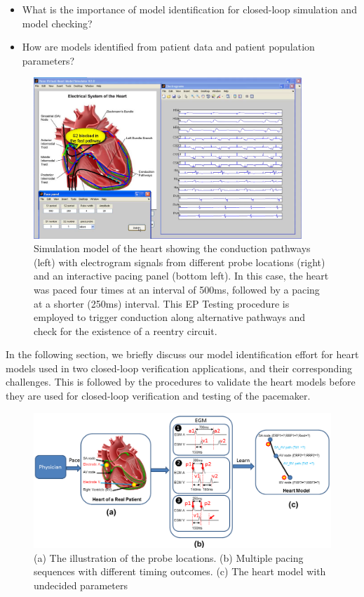 \begin{itemize}
	\vspace{-5pt}
	\item What is the importance of model identification for closed-loop simulation and model checking?
	\vspace{-5pt}
    	\item How are models identified from patient data and patient population parameters?
\end{itemize}
\begin{figure}[t]
\center
	\includegraphics[width=0.9\textwidth]{figs/vhmsim.png}
	\caption{Simulation model of the heart showing the conduction pathways (left) with electrogram signals from different probe locations (right) and an interactive pacing panel (bottom left). In this case, the heart was paced four times at an interval of 500ms, followed by a pacing at a shorter (250ms) interval. This EP Testing procedure is employed to trigger conduction along alternative pathways and check for the existence of a reentry circuit.}
	\label{fig:vhmsim}
\end{figure}
In the following section, we briefly discuss our model identification effort for heart models used in two closed-loop verification applications, and their corresponding challenges. This is followed by the procedures to validate the heart models before they are used for closed-loop verification and testing of the pacemaker.
\begin{figure}[!b]
\centering
		\includegraphics[width=0.9  \textwidth]{figs/modelID.png}
		
\caption{\small (a) The illustration of the probe locations. (b) Multiple pacing sequences with different timing outcomes. (c) The heart model with undecided parameters}
\label{fig:modelID}
\end{figure} 

